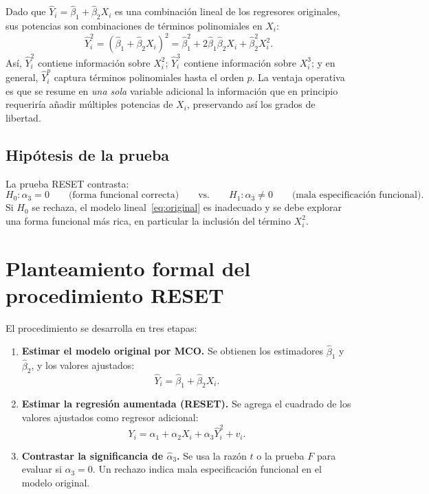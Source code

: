 \documentclass[12pt, letterpaper]{article}
\begin{document}
Dado que $\hat{Y}_i = \hat{\beta}_1 + \hat{\beta}_2 X_i$ es una
combinación lineal de los regresores originales, sus potencias son
combinaciones de términos polinomiales en $X_i$:
\[
  \hat{Y}_i^2 = (\hat{\beta}_1 + \hat{\beta}_2 X_i)^2
  = \hat{\beta}_1^2 + 2\hat{\beta}_1\hat{\beta}_2 X_i
    + \hat{\beta}_2^2 X_i^2.
\]
Así, $\hat{Y}_i^2$ contiene información sobre $X_i^2$; $\hat{Y}_i^3$
contiene información sobre $X_i^3$; y en general, $\hat{Y}_i^p$ captura
términos polinomiales hasta el orden $p$. La ventaja operativa es que
se resume en \emph{una sola} variable adicional la información que en
principio requeriría añadir múltiples potencias de $X_i$, preservando
así los grados de libertad.

\subsection{Hipótesis de la prueba}

La prueba RESET contrasta:
\[
  H_0: \alpha_3 = 0
  \qquad \text{(forma funcional correcta)}
  \qquad \text{vs.} \qquad
  H_1: \alpha_3 \neq 0
  \qquad \text{(mala especificación funcional)}.
\]
Si $H_0$ se rechaza, el modelo lineal~\eqref{eq:original} es inadecuado
y se debe explorar una forma funcional más rica, en particular la
inclusión del término $X_i^2$.

\section{Planteamiento formal del procedimiento RESET}

El procedimiento se desarrolla en tres etapas:

\begin{enumerate}[leftmargin=1.8cm, label=\textbf{Etapa \arabic*.}]

  \item \textbf{Estimar el modelo original por MCO.} Se obtienen los
    estimadores $\hat{\beta}_1$ y $\hat{\beta}_2$, y los valores ajustados:
    \begin{equation}
      \hat{Y}_i = \hat{\beta}_1 + \hat{\beta}_2 X_i.
      \label{eq:yhat}
    \end{equation}

  \item \textbf{Estimar la regresión aumentada (RESET).} Se agrega el
    cuadrado de los valores ajustados como regresor adicional:
    \begin{equation}
      Y_i = \alpha_1 + \alpha_2 X_i + \alpha_3 \hat{Y}_i^2 + v_i.
      \label{eq:reset}
    \end{equation}

  \item \textbf{Contrastar la significancia de $\hat{\alpha}_3$.}
    Se usa la razón $t$ o la prueba $F$ para evaluar si $\alpha_3 = 0$.
    Un rechazo indica mala especificación funcional en el modelo original.

\end{enumerate}
\end{document}

